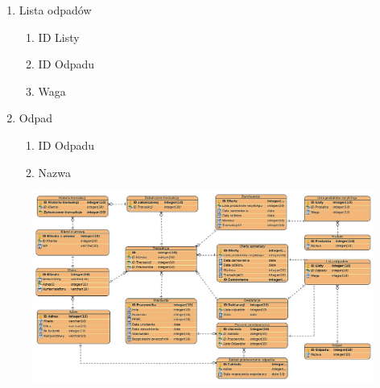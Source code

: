 \begin{enumerate}
		\item Lista odpadów
		\begin{enumerate}
			\item ID Listy
			\item ID Odpadu
			\item Waga
		\end{enumerate}

		\item Odpad
		\begin{enumerate}
			\item ID Odpadu
			\item Nazwa
		\end{enumerate}
	\end{enumerate}
\begin{landscape}
	\begin{figure}
		\centering
		\centerline{\includegraphics[width=28cm]{img/ERD.eps}}
	\end{figure}
\end{landscape}